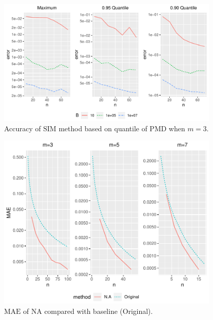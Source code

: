 \documentclass[12pt]{article}
\newcommand{\MAE}{{\textrm{MAE}}}
\newcommand{\PMD}{\textrm{PMD}}
\newcommand{\SIM}{{\textrm{SIM}}}
\newcommand{\NA}{{\textrm{NA}}}
\begin{document}
\begin{figure}%
\begin{center}
	\includegraphics[width=0.95\textwidth]{figures/simulation.pdf}
	\caption{Accuracy of $\SIM$ method based on quantile of $\PMD$ when $m=3$.}
	\label{fig:accuracy.sim}
\end{center}
\end{figure}

\begin{figure}%
\begin{center}
	\includegraphics[width=0.95\textwidth]{figures/mae.pdf}
	\caption{$\MAE$ of $\NA$ compared with baseline (Original).}
	\label{fig:mae.na}
\end{center}
\end{figure}



\end{document}
